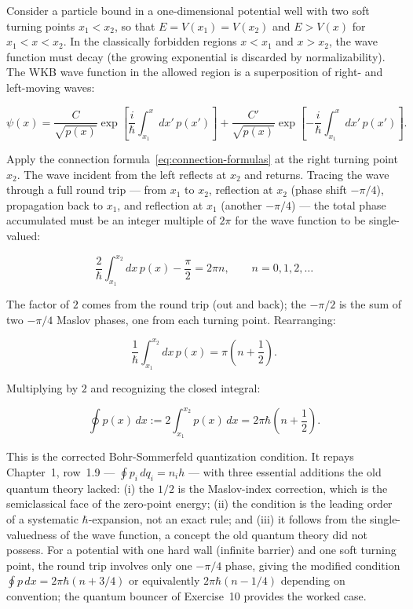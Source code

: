 Consider a particle bound in a one-dimensional potential well with two soft turning points $x_1 < x_2$, so that $E = V(x_1) = V(x_2)$ and $E > V(x)$ for $x_1 < x < x_2$. In the classically forbidden regions $x < x_1$ and $x > x_2$, the wave function must decay (the growing exponential is discarded by normalizability). The WKB wave function in the allowed region is a superposition of right- and left-moving waves:
\begin{linenomath}
\begin{equation}
\psi(x) = \frac{C}{\sqrt{p(x)}}\exp\left[\frac{i}{\hbar}\int_{x_1}^x dx'\,p(x')\right] + \frac{C'}{\sqrt{p(x)}}\exp\left[-\frac{i}{\hbar}\int_{x_1}^x dx'\,p(x')\right].
\end{equation}
\end{linenomath}
Apply the connection formula~\eqref{eq:connection-formulas} at the right turning point $x_2$. The wave incident from the left reflects at $x_2$ and returns. Tracing the wave through a full round trip --- from $x_1$ to $x_2$, reflection at $x_2$ (phase shift $-\pi/4$), propagation back to $x_1$, and reflection at $x_1$ (another $-\pi/4$) --- the total phase accumulated must be an integer multiple of $2\pi$ for the wave function to be single-valued:
\begin{linenomath}
\begin{equation*}
\frac{2}{\hbar}\int_{x_1}^{x_2} dx\,p(x) - \frac{\pi}{2} = 2\pi n, \qquad n = 0,1,2,\ldots
\end{equation*}
\end{linenomath}
The factor of $2$ comes from the round trip (out and back); the $-\pi/2$ is the sum of two $-\pi/4$ Maslov phases, one from each turning point. Rearranging:
\begin{linenomath}
\begin{equation}
\frac{1}{\hbar}\int_{x_1}^{x_2} dx\,p(x) = \pi\left(n + \frac{1}{2}\right).
\end{equation}
\end{linenomath}
Multiplying by $2$ and recognizing the closed integral:
\begin{linenomath}
\begin{equation}
\oint p(x)\,dx := 2\int_{x_1}^{x_2} p(x)\,dx = 2\pi\hbar\left(n + \frac{1}{2}\right).
\label{eq:bohr-sommerfeld-corrected}
\end{equation}
\end{linenomath}
This is the corrected Bohr-Sommerfeld quantization condition. It repays Chapter~1, row~1.9 --- $\oint p_i\,dq_i = n_i h$ --- with three essential additions the old quantum theory lacked: (i) the $1/2$ is the Maslov-index correction, which is the semiclassical face of the zero-point energy; (ii) the condition is the leading order of a systematic $\hbar$-expansion, not an exact rule; and (iii) it follows from the single-valuedness of the wave function, a concept the old quantum theory did not possess. For a potential with one hard wall (infinite barrier) and one soft turning point, the round trip involves only one $-\pi/4$ phase, giving the modified condition $\oint p\,dx = 2\pi\hbar(n + 3/4)$ or equivalently $2\pi\hbar(n - 1/4)$ depending on convention; the quantum bouncer of Exercise~10 provides the worked case.

